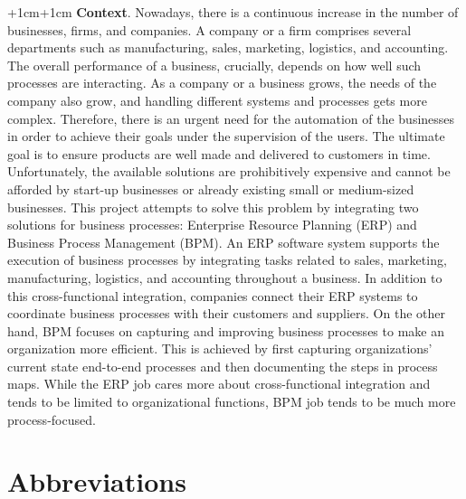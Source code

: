 \documentclass[11pt,a4paper,oneside]{bth}
\begin{document}
\abstract
\thispagestyle{empty}
\begin{changemargin}{+1cm}{+1cm}
\noindent
\textbf{Context}. Nowadays, there is a continuous increase in the 
number of businesses, firms, and companies. A company or a firm 
comprises several departments such as manufacturing, sales, marketing, 
logistics, and accounting. The overall performance of a business, 
crucially, depends on how well such processes are interacting. As a 
company or a business grows, the needs of the company also grow, and 
handling different systems and processes gets more complex. Therefore, 
there is an urgent need for the automation of the businesses in order to 
achieve their goals under the supervision of the users. The ultimate goal 
is to ensure products are well made and delivered to customers in time. 
Unfortunately, the available solutions are prohibitively expensive and 
cannot be afforded by start-up businesses or already existing small or 
medium-sized businesses.
\newline \newline
This project attempts to solve this problem by integrating two 
solutions for business processes: Enterprise Resource Planning (ERP) 
and Business Process Management (BPM). An ERP software system supports 
the execution of business processes by integrating tasks related to sales, 
marketing, manufacturing, logistics, and accounting throughout a business. 
In addition to this cross-functional integration, companies connect their 
ERP systems to coordinate business processes with their customers and 
suppliers. On the other hand, BPM focuses on capturing and improving 
business processes to make an organization more efficient. This is 
achieved by first capturing organizations’ current state end-to-end 
processes and then documenting the steps in process maps. While the 
ERP job cares more about cross-functional integration and tends to be 
limited to organizational functions, BPM job tends to be much more process-focused. 



\end{changemargin}


\newpage
\tableofcontents

\newpage
\listoffigures

\newpage

\chapter*{Abbreviations}
 
\end{document}
